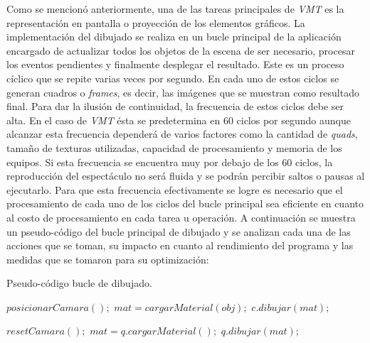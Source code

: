 Como se mencionó anteriormente, una de las tareas principales de \emph{VMT} es la representación en pantalla o proyección de los elementos gráficos. La implementación del dibujado se realiza en un bucle principal de la aplicación encargado de actualizar todos los objetos de la escena de ser necesario, procesar los eventos pendientes y finalmente desplegar el resultado. Este es un proceso cíclico que se repite varias veces por segundo.
En cada uno de estos ciclos se generan cuadros o \emph{frames}, es decir, las imágenes que se muestran como resultado final.
Para dar la ilusión de continuidad, la frecuencia de estos ciclos debe ser alta. En el caso de \emph{VMT} ésta se predetermina en 60 ciclos por segundo aunque alcanzar esta frecuencia dependerá de varios factores como la cantidad de \emph{quads}, tamaño de texturas utilizadas, capacidad de procesamiento y memoria de los equipos.
Si esta frecuencia se encuentra muy por debajo de los 60 ciclos, la reproducción del espectáculo no será fluida y se podrán percibir saltos o pausas al ejecutarlo.
Para que esta frecuencia efectivamente se logre es necesario que el procesamiento de cada uno de los ciclos del bucle principal sea eficiente en cuanto al costo de procesamiento en cada tarea u operación. A continuación se muestra un pseudo-código del bucle principal de dibujado y se analizan cada una de las acciones que se toman, su impacto en cuanto al rendimiento del programa y las medidas que se tomaron para su optimización:

\begin{algorithm}
    \caption{Pseudo-código bucle de dibujado.}
    \label{alg:mainLoop}
    \begin{algorithmic}
      \State $posicionarCamara();$
             \State $mat = cargarMaterial(obj);$
             \State $c.dibujar(mat);$
         \EndFor
      \EndFor

      \State $resetCamara();$
         \State $mat = q.cargarMaterial();$
         \State $q.dibujar(mat);$
      \EndFor
    \end{algorithmic}
\end{algorithm}

